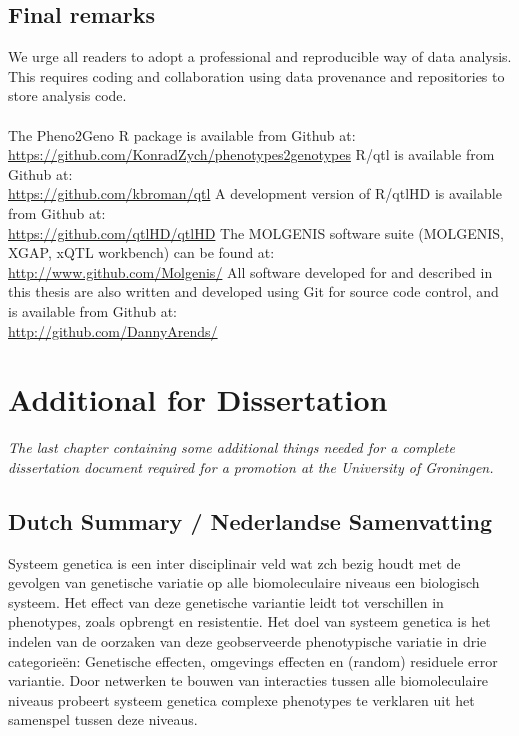\section{Final remarks}
We urge all readers to adopt a professional and reproducible way of data analysis. This requires 
coding and collaboration using data provenance and repositories to store analysis code.\\\\
The Pheno2Geno R package is available from Github at:\\
\url{https://github.com/KonradZych/phenotypes2genotypes}
R/qtl is available from Github at:\\
\url{https://github.com/kbroman/qtl}
A development version of R/qtlHD is available from Github at:\\
\url{https://github.com/qtlHD/qtlHD}
The MOLGENIS software suite (MOLGENIS, XGAP, xQTL workbench) can be found at:\\
\url{http://www.github.com/Molgenis/}
All software developed for and described in this thesis are also written and developed using Git 
for source code control, and is available from Github at:\\
\url{http://github.com/DannyArends/}

\chapter{Additional for Dissertation}
\thispagestyle{empty}
\emph{The last chapter containing some additional things needed for a complete 
dissertation document required for a promotion at the University of Groningen.}
\null
\vfill
\newpage

\section{Dutch Summary / Nederlandse Samenvatting}
Systeem genetica is een inter disciplinair veld wat zch bezig houdt met de gevolgen van 
genetische variatie op alle biomoleculaire niveaus een biologisch systeem. Het effect van 
deze genetische variantie leidt tot verschillen in phenotypes, zoals opbrengt en resistentie. 
Het doel van systeem genetica is het indelen van de oorzaken van deze geobserveerde 
phenotypische variatie in drie categorie\"en: Genetische effecten, omgevings effecten en 
(random) residuele error variantie. Door netwerken te bouwen van interacties tussen 
alle biomoleculaire niveaus probeert systeem genetica complexe phenotypes te verklaren uit 
het samenspel tussen deze niveaus.

